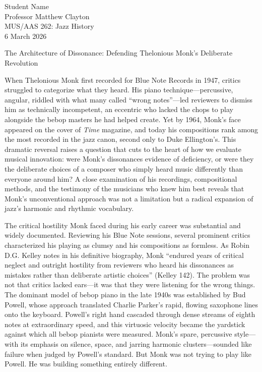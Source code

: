\documentclass[12pt]{article}
\begin{document}
\noindent Student Name\\
Professor Matthew Clayton\\
MUS/AAS 262: Jazz History\\
6 March 2026

\begin{center}
The Architecture of Dissonance: Defending Thelonious Monk's Deliberate Revolution
\end{center}

When Thelonious Monk first recorded for Blue Note Records in 1947, critics struggled to categorize what they heard. His piano technique---percussive, angular, riddled with what many called ``wrong notes''---led reviewers to dismiss him as technically incompetent, an eccentric who lacked the chops to play alongside the bebop masters he had helped create. Yet by 1964, Monk's face appeared on the cover of \textit{Time} magazine, and today his compositions rank among the most recorded in the jazz canon, second only to Duke Ellington's. This dramatic reversal raises a question that cuts to the heart of how we evaluate musical innovation: were Monk's dissonances evidence of deficiency, or were they the deliberate choices of a composer who simply heard music differently than everyone around him? A close examination of his recordings, compositional methods, and the testimony of the musicians who knew him best reveals that Monk's unconventional approach was not a limitation but a radical expansion of jazz's harmonic and rhythmic vocabulary.

The critical hostility Monk faced during his early career was substantial and widely documented. Reviewing his Blue Note sessions, several prominent critics characterized his playing as clumsy and his compositions as formless. As Robin D.G. Kelley notes in his definitive biography, Monk ``endured years of critical neglect and outright hostility from reviewers who heard his dissonances as mistakes rather than deliberate artistic choices'' (Kelley 142). The problem was not that critics lacked ears---it was that they were listening for the wrong things. The dominant model of bebop piano in the late 1940s was established by Bud Powell, whose approach translated Charlie Parker's rapid, flowing saxophone lines onto the keyboard. Powell's right hand cascaded through dense streams of eighth notes at extraordinary speed, and this virtuosic velocity became the yardstick against which all bebop pianists were measured. Monk's spare, percussive style---with its emphasis on silence, space, and jarring harmonic clusters---sounded like failure when judged by Powell's standard. But Monk was not trying to play like Powell. He was building something entirely different.
\end{document}
